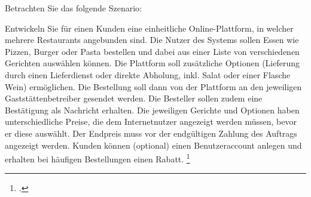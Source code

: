\documentclass{lehramt-informatik-aufgabe}
\begin{document}

Betrachten Sie das folgende Szenario:

Entwickeln Sie für einen Kunden eine einheitliche Online-Plattform, in
welcher mehrere Restaurants angebunden sind. Die Nutzer des Systems
sollen Essen wie Pizzen, Burger oder Pasta bestellen und dabei aus einer
Liste von verschiedenen Gerichten auswählen können. Die Plattform soll
zusätzliche Optionen (\zB Lieferung durch einen Lieferdienst oder
direkte Abholung, inkl. Salat oder einer Flasche Wein) ermöglichen. Die
Bestellung soll dann von der Plattform an den jeweiligen
Gaststättenbetreiber gesendet werden. Die Besteller sollen zudem eine
Bestätigung als Nachricht erhalten. Die jeweiligen Gerichte und Optionen
haben unterschiedliche Preise, die dem Internetnutzer angezeigt werden
müssen, bevor er diese auswählt. Der Endpreis muss vor der endgültigen
Zahlung des Auftrags angezeigt werden. Kunden können (optional) einen
Benutzeraccount anlegen und erhalten bei häufigen Bestellungen einen
Rabatt.
\footcite{examen:66116:2020:09}
\end{document}
